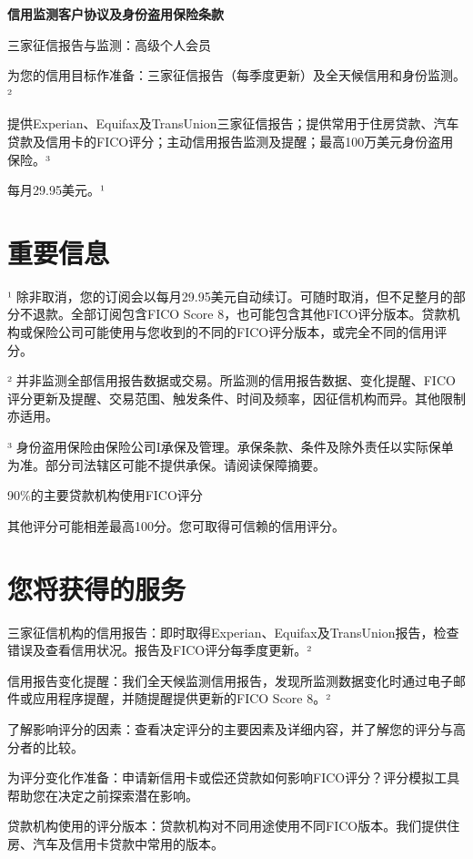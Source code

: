 \documentclass[UTF8,fontset=none,11pt,a4paper]{ctexart}
\begin{document}
{\noindent\LARGE\bfseries 信用监测客户协议及身份盗用保险条款\par}
\vspace{10pt}
三家征信报告与监测：高级个人会员


为您的信用目标作准备：三家征信报告（每季度更新）及全天候信用和身份监测。²


提供Experian、Equifax及TransUnion三家征信报告；提供常用于住房贷款、汽车贷款及信用卡的FICO评分；主动信用报告监测及提醒；最高100万美元身份盗用保险。³


每月29.95美元。¹


\section*{重要信息}
¹ 除非取消，您的订阅会以每月29.95美元自动续订。可随时取消，但不足整月的部分不退款。全部订阅包含FICO Score 8，也可能包含其他FICO评分版本。贷款机构或保险公司可能使用与您收到的不同的FICO评分版本，或完全不同的信用评分。


² 并非监测全部信用报告数据或交易。所监测的信用报告数据、变化提醒、FICO评分更新及提醒、交易范围、触发条件、时间及频率，因征信机构而异。其他限制亦适用。


³ 身份盗用保险由保险公司I承保及管理。承保条款、条件及除外责任以实际保单为准。部分司法辖区可能不提供承保。请阅读保障摘要。


90\%的主要贷款机构使用FICO评分


其他评分可能相差最高100分。您可取得可信赖的信用评分。


\section*{您将获得的服务}
三家征信机构的信用报告：即时取得Experian、Equifax及TransUnion报告，检查错误及查看信用状况。报告及FICO评分每季度更新。²


信用报告变化提醒：我们全天候监测信用报告，发现所监测数据变化时通过电子邮件或应用程序提醒，并随提醒提供更新的FICO Score 8。²


了解影响评分的因素：查看决定评分的主要因素及详细内容，并了解您的评分与高分者的比较。


为评分变化作准备：申请新信用卡或偿还贷款如何影响FICO评分？评分模拟工具帮助您在决定之前探索潜在影响。


贷款机构使用的评分版本：贷款机构对不同用途使用不同FICO版本。我们提供住房、汽车及信用卡贷款中常用的版本。
\end{document}

